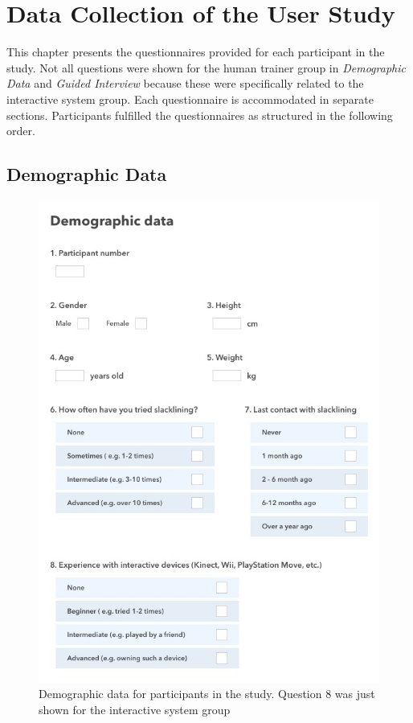 \begin{appendices}

\label{app_questionnaire}
\chapter{Data Collection of the User Study}
This chapter presents the questionnaires provided for each participant in the study.
Not all questions were shown for the human trainer group in \textit{Demographic Data} and \textit{Guided Interview} because these were specifically related to the interactive system group.
Each questionnaire is accommodated in separate sections.
Participants fulfilled the questionnaires as structured in the following order.

\clearpage

\section{Demographic Data}
\begin{figure}[htb]
	\centering
	\begin{minipage}[t]{0.82\linewidth}
		\centering
		\includegraphics[width=1\linewidth]{Pictures/App_DemographicDataISG}
		\caption{Demographic data for participants in the study. Question 8 was just shown for the interactive system group}
		\label{fig:App_DemographicDataHTG}
	\end{minipage}
\end{figure}


\end{appendices}
